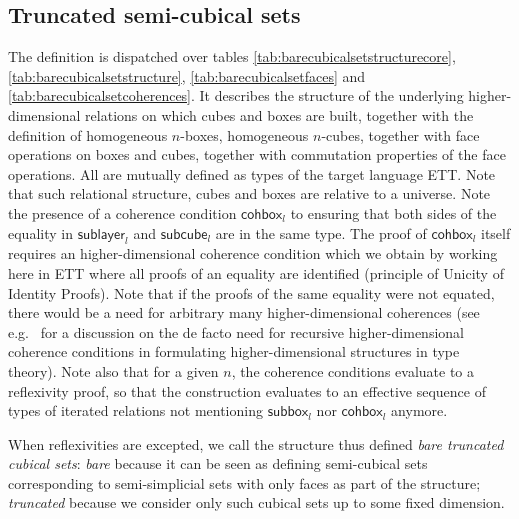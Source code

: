 \documentclass[10pt]{art}
\newcommand{\sort}[1]{\ensuremath{\mathsf{U}_{#1}}}
\newcommand{\unittype}{\ensuremath{\mathsf{unit}}}
\newcommand{\defeq}{\ensuremath{\triangleq}}
\newcommand{\cubeset}[2]{\ensuremath{\mathsf{cubset}_{#1}^{<#2}}}
\newcommand{\cubesetcomp}[2]{\ensuremath{\mathsf{cubset}_{#1}^{=#2}}}
\newcommand{\subbox}[2]{\ensuremath{\mathsf{subbox}_{#1}^{#2}}}
\newcommand{\sublayer}[2]{\ensuremath{\mathsf{sublayer}_{#1}^{#2}}}
\newcommand{\subcube}[2]{\ensuremath{\mathsf{subcube}_{#1}^{#2}}}
\newcommand{\fullbox}[2]{\ensuremath{\mathsf{fullbox}_{#1}^{#2}}}
\newcommand{\cohbox}[2]{\ensuremath{\mathsf{cohbox}_{#1}^{#2}}}
\newcommand{\imp}{\ensuremath{\rightarrow}}
\renewcommand{\D}{\ensuremath{(D)}}
\newcommand{\eqnline}[4]{$#1$ & $#2$ & $#3$ & $#4$ \\}
\newcommand{\mc}[1]{\multicolumn{4}{c}{\textit{#1}} \\\\}
\begin{document}
\subsection{Truncated semi-cubical sets}
The definition is dispatched over tables \ref{tab:barecubicalsetstructurecore}, \ref{tab:barecubicalsetstructure}, \ref{tab:barecubicalsetfaces} and \ref{tab:barecubicalsetcoherences}. It describes the structure of the underlying higher-dimensional relations on which cubes and boxes are built, together with the definition of homogeneous $n$-boxes, homogeneous $n$-cubes, together with face operations on boxes and cubes, together with commutation properties of the face operations. All are mutually defined as types of the target language ETT. Note that such relational structure, cubes and boxes are relative to a universe. Note the presence of a coherence condition $\cohbox{l}{}$ to ensuring that both sides of the equality in $\sublayer{l}{}$ and $\subcube{l}{}$ are in the same type. The proof of $\cohbox{l}{}$ itself requires an higher-dimensional coherence condition which we obtain by working here in ETT where all proofs of an equality are identified (principle of Unicity of Identity Proofs). Note that if the proofs of the same equality were not equated, there would be a need for arbitrary many higher-dimensional coherences (see e.g.~\cite{Herbelin15} for a discussion on the de facto need for recursive higher-dimensional coherence conditions in formulating higher-dimensional structures in type theory). Note also that for a given $n$, the coherence conditions evaluate to a reflexivity proof, so that the construction evaluates to an effective sequence of types of iterated relations not mentioning $\subbox{l}{}$ nor $\cohbox{l}{}$ anymore.

When reflexivities are excepted, we call the structure thus defined \emph{bare truncated cubical sets}: \emph{bare} because it can be seen as defining semi-cubical sets corresponding to semi-simplicial sets with only faces as part of the structure; \emph{truncated} because we consider only such cubical sets up to some fixed dimension.

\end{document}
